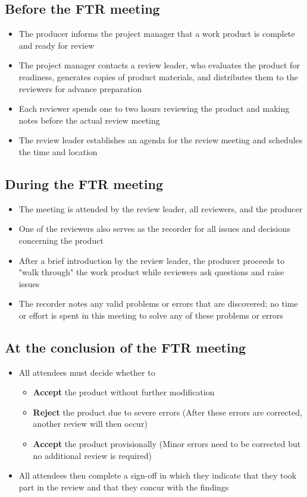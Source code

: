 \documentclass{article}
\begin{document}
\subsection{Before the FTR meeting}

\begin{itemize}
  \item The producer informs the project manager that a work product is complete and ready for review
  \item The project manager contacts a review leader, who evaluates the product for readiness, generates copies of product materials, and distributes them to the reviewers for advance preparation
  \item Each reviewer spends one to two hours reviewing the product and making notes before the actual review meeting
  \item The review leader establishes an agenda for the review meeting and schedules the time and location
\end{itemize}

\subsection{During the FTR meeting}

\begin{itemize}
  \item The meeting is attended by the review leader, all reviewers, and the producer
  \item One of the reviewers also serves as the recorder for all issues and decisions concerning the product
  \item After a brief introduction by the review leader, the producer proceeds to "walk through" the work product while reviewers ask questions and raise issues
  \item The recorder notes any valid problems or errors that are discovered; no time or effort is spent in this meeting to solve any of these problems or errors
\end{itemize}

\subsection{At the conclusion of the FTR meeting}

\begin{itemize}
  \item All attendees must decide whether to 
  \begin{itemize}
    \item \textbf{Accept} the product without further modification
    \item \textbf{Reject} the product due to severe errors (After these errors are corrected, another review will then occur)
    \item \textbf{Accept} the product provisionally (Minor errors need to be corrected but no additional review is required)
  \end{itemize}
  \item All attendees then complete a sign-off in which they indicate that they took part in the review and that they concur with the findings
\end{itemize}
\end{document}
